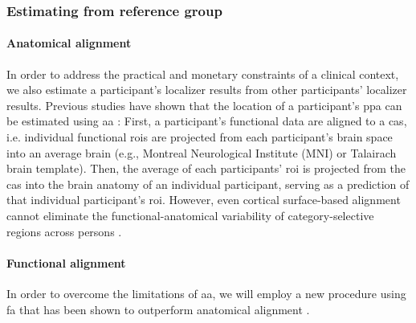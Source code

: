 

\subsubsection{Estimating from reference group}



\paragraph{Anatomical alignment}
In order to address the practical and monetary constraints of a clinical
context, we also estimate a participant's localizer results from other
participants' localizer results.
Previous studies have shown that the location of a participant's \ac{ppa} can be
estimated using \ac{aa} \citep{frost2012measuring, rosenke2021probabilistic,
weiner2018defining, zhen2017quantifying}:
%
First, a participant's functional data are aligned to a \ac{cas}, i.e.
individual functional \acp{roi} are projected from each participant's brain
space into an average brain (e.g., Montreal Neurological Institute (MNI)
\citep{evans1993mni} or Talairach brain template).
%
Then, the average of each participants' \ac{roi} is projected from the \ac{cas}
into the brain anatomy of an individual participant, serving as a prediction of
that individual participant's \ac{roi}.
%
However, even cortical surface-based alignment \citep{fischl2012freesurfer}
cannot eliminate the functional-anatomical variability of category-selective
regions across persons \citep{duncan2009consistency, frost2012measuring,
weiner2018defining, weiner2014mid}.


\paragraph{Functional alignment}


In order to overcome the limitations of \ac{aa}, we will employ a new procedure
using \ac{fa} that has been shown to outperform anatomical alignment
\citep{haxby2020hyperalignment, bazeille2021empirical}.

